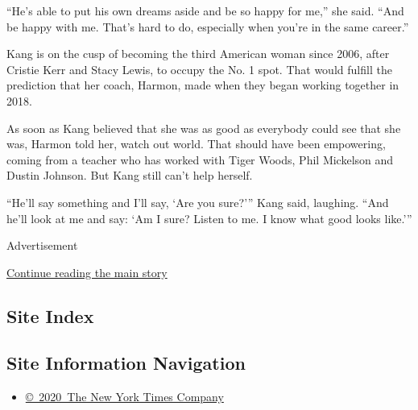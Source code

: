 ``He's able to put his own dreams aside and be so happy for me,'' she
said. ``And be happy with me. That's hard to do, especially when you're
in the same career.''

Kang is on the cusp of becoming the third American woman since 2006,
after Cristie Kerr and Stacy Lewis, to occupy the No. 1 spot. That would
fulfill the prediction that her coach, Harmon, made when they began
working together in 2018.

As soon as Kang believed that she was as good as everybody could see
that she was, Harmon told her, watch out world. That should have been
empowering, coming from a teacher who has worked with Tiger Woods, Phil
Mickelson and Dustin Johnson. But Kang still can't help herself.

``He'll say something and I'll say, `Are you sure?''' Kang said,
laughing. ``And he'll look at me and say: `Am I sure? Listen to me. I
know what good looks like.'''

Advertisement

\protect\hyperlink{after-bottom}{Continue reading the main story}

\hypertarget{site-index}{%
\subsection{Site Index}\label{site-index}}

\hypertarget{site-information-navigation}{%
\subsection{Site Information
Navigation}\label{site-information-navigation}}

\begin{itemize}
\tightlist
\item
  \href{https://help.nytimes3xbfgragh.onion/hc/en-us/articles/115014792127-Copyright-notice}{©~2020~The
  New York Times Company}
\end{itemize}


